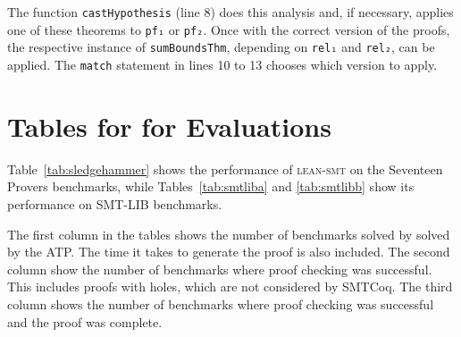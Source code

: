 \documentclass[runningheads]{llncs}
\newcommand{\tactic}{\textsc{lean-smt}\xspace}
\begin{document}
The function \texttt{castHypothesis} (line 8) does this analysis and, if necessary,
applies one of these theorems to \texttt{pf₁} or \texttt{pf₂}.
%
Once with the correct version of the proofs, the respective instance of
\texttt{sumBoundsThm}, depending on \texttt{rel₁} and \texttt{rel₂}, can be
applied.
%
The \texttt{match} statement in lines 10 to 13 chooses which version to apply.

\section{Tables for for Evaluations}

\begin{table}[t]
  \centering
  
  \caption{Performance of \tactic on baseline Seventeen Provers benchmarks (5000 total).}
  \label{tab:sledgehammer}
\end{table}

Table~\ref{tab:sledgehammer} shows the performance of \tactic on the Seventeen Provers benchmarks, while Tables~\ref{tab:smtliba} and \ref{tab:smtlibb} show its performance on SMT-LIB benchmarks.

\begin{table}[h]
  \centering
  
  \caption{Performance of \tactic on supported SMT-LIB fragments (24817 total).}
  \label{tab:smtliba}
\end{table}

The first column in the tables shows the number of benchmarks solved by solved by the ATP. The time it takes to generate the proof is also included. The second column show the number of benchmarks where proof checking was successful. This includes proofs with holes, which are not considered by SMTCoq. The third column shows the number of benchmarks where proof checking was successful and the proof was complete.

\begin{table}[t]
  \centering
  
  \caption{Performance of \tactic on the quantifier-free subset of SMT-LIB benchmarks (11804 total).}
  \label{tab:smtlibb}
\end{table}
\end{document}
